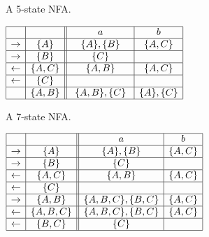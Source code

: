 \documentclass{llncs}
\begin{document}
\begin{example}
\begin{table}[t]
\begin{minipage}[b]{0.45\linewidth}
\caption{A 5-state NFA.}
\label{tab:b3}
\begin{center}
$
\begin{array}{|c| c||c| c| }    
\hline
& \ \  \ \ 
&\ \ a \ \ &\ \ b \ \ \\
\hline  
\rightarrow & \{A\}
& \ \{A\},\{B\} \ & \ \{A,C\} \ \\
\hline  
\rightarrow& \ \{B\} \
& \{C\} & \\
\hline  
\leftarrow & \{A,C\}
 &  \{A,B\} &  \{A,C\}  \\
\hline  
\leftarrow& \ \{C\} \
&  & \\
 \hline  
 & \{A,B\}
 & \ \{A,B\},\{C\} \ &  \{A\},\{C\}  \\
\hline  
\end{array}
$
\end{center}
\end{minipage}
\hspace{.4cm}
\begin{minipage}[b]{0.45\linewidth}
\caption{A 7-state NFA.}
\label{tab:b4}
\begin{center}
$
\begin{array}{|c| c||c| c| c|c|}    
\hline
& \ \  \ \ 
&\ \ a \ \ &\ \ b \ \   \\
\hline  
\rightarrow & \ \{A\} \
&  \ \{A\},\{B\} \  &  \{A,C\}     \\
\hline  
\rightarrow& \{B\}
&  \{C\} &  \\
\hline  
\leftarrow& \{A,C\}
&  \  \{A,B\} \  &  \{A,C\} \\
\hline  
\leftarrow& \{C\}
&    &   \\
\hline  
\rightarrow& \{A,B\}
&   \{A,B,C\}, \{B,C\}  &  \{A,C\} \\
\hline  
\leftarrow& \{A,B,C\}
&    \{A,B,C\},\{B,C\}   &  \{A,C\} \\
\hline  
\leftarrow& \{B,C\}
&  \  \{C\} \  &   \\
\hline  
\end{array}
$
\end{center}
\end{minipage}
\end{table}


\end{example}
\end{document}
